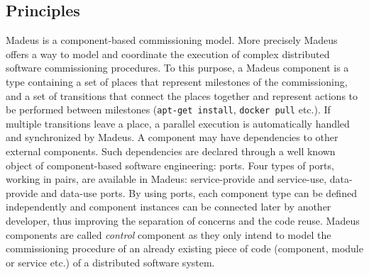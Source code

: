 
\subsection{Principles}

Madeus is a component-based commissioning model. More precisely Madeus
offers a way to model and coordinate the execution of complex
distributed software commissioning procedures. To this purpose, a
Madeus component is a type containing a set of places that represent
milestones of the commissioning, and a set of transitions that connect
the places together and represent actions to be performed between
milestones (\eg \texttt{apt-get install}, \texttt{docker pull}
etc.). If multiple transitions leave a place, a parallel execution is
automatically handled and synchronized by Madeus. A component may have
dependencies to other external components. Such dependencies are
declared through a well known object of component-based software
engineering: ports. Four types of ports, working in pairs, are
available in Madeus: service-provide and service-use, data-provide and
data-use ports. By using ports, each component type can be defined
independently and component instances can be connected later by
another developer, thus improving the separation of concerns and the
code reuse. Madeus components are called \emph{control} component as
they only intend to model the commissioning procedure of an already
existing piece of code (component, module or service etc.) of a
distributed software system.

